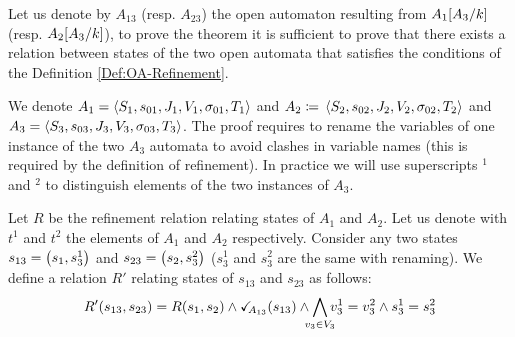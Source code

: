 \documentclass[runningheads]{llncs}
\begin{document}
\proof
Let us denote by $A_{13}$ (resp. $A_{23}$) the open automaton resulting from $A_1{\left[A_3\middle/k\right]}$ (resp. $A_2{\left[A_3\middle/k\right]}$),  to prove the theorem it is sufficient to prove that there exists a relation between states of the two open automata that satisfies the conditions of the Definition \ref{Def:OA-Refinement}. 

We denote $A_1=  \left<S_1,s_{01},J_1,V_1,\sigma_{01},T_1\right>$ and \(A_2 \defobject \OA{S_2}{s_{02}}{J_2}{V_2}{\sigma_{02}}{T_2}\) and $A_3 = \left<S_3,s_{03},J_3,V_3,\sigma_{03},T_3\right>$. The proof requires  to rename the variables of one instance of the two $A_3$ automata to avoid clashes in variable names (this is required by the definition of refinement). In practice we will use superscripts ${}^1$ and ${}^2$ to distinguish elements of the two instances of $A_3$.

Let $R$ be the refinement relation relating states of $A_1$ and $A_2$. 
Let us denote with $t^1$ and $t^2$  the elements of $A_1$ and $A_2$ respectively.
Consider any two states $s_{13} = {\left(s_1,s^1_3\right)}$ and $s_{23} = {\left(s_2,s^2_3\right)}$ ($s^1_3$ and $s^2_3$  are the same with renaming). We define a relation $R'$ relating states of $s_{13}$ and $s_{23}$ as follows:
\[ R' \mpar{s_{13}, s_{23}} = R\mpar{s_{1}, s_{2}} \land \reach{A_{13}}(s_{13})  %
 \wedge \bigwedge_\subbox{v_3\in V_3}
 v^1_3=v^2_3\land s^1_3 = s^2_3\]

\end{document}
